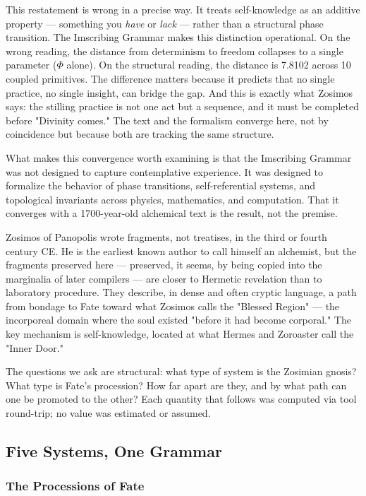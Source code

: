 \documentclass[12pt,a4paper]{article}
\begin{document}
This restatement is wrong in a precise way. It treats self-knowledge as an additive property --- something you \emph{have} or \emph{lack} --- rather than a structural phase transition. The Imscribing Grammar makes this distinction operational. On the wrong reading, the distance from determinism to freedom collapses to a single parameter ($\Phi$ alone). On the structural reading, the distance is 7.8102 across 10 coupled primitives. The difference matters because it predicts that no single practice, no single insight, can bridge the gap. And this is exactly what Zosimos says: the stilling practice is not one act but a sequence, and it must be completed before "Divinity comes." The text and the formalism converge here, not by coincidence but because both are tracking the same structure.

What makes this convergence worth examining is that the Imscribing Grammar was not designed to capture contemplative experience. It was designed to formalize the behavior of phase transitions, self-referential systems, and topological invariants across physics, mathematics, and computation. That it converges with a 1700-year-old alchemical text is the result, not the premise.

Zosimos of Panopolis wrote fragments, not treatises, in the third or fourth century CE. He is the earliest known author to call himself an alchemist, but the fragments preserved here --- preserved, it seems, by being copied into the marginalia of later compilers --- are closer to Hermetic revelation than to laboratory procedure. They describe, in dense and often cryptic language, a path from bondage to Fate toward what Zosimos calls the "Blessed Region" --- the incorporeal domain where the soul existed "before it had become corporal." The key mechanism is self-knowledge, located at what Hermes and Zoroaster call the "Inner Door."

The questions we ask are structural: what type of system is the Zosimian gnosis? What type is Fate's procession? How far apart are they, and by what path can one be promoted to the other? Each quantity that follows was computed via tool round-trip; no value was estimated or assumed.

\subsection{Five Systems, One Grammar}

\subsubsection{The Processions of Fate}
\end{document}
